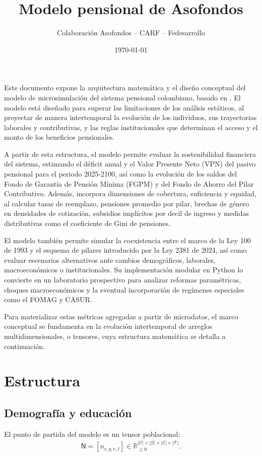 \documentclass[11pt]{article}
\title{\Large\textbf{Modelo pensional de Asofondos} \\[0.2cm]}
\author{\normalsize Colaboración Asofondos -- CARF -- Fedesarrollo}
\date{\normalsize \today}
\begin{document}
\maketitle

Este documento expone la arquitectura matemática y el diseño conceptual del modelo de microsimulación del sistema pensional colombiano, basado en \citet{becerra2025simulation}. El modelo está diseñado para superar las limitaciones de los análisis estáticos, al proyectar de manera intertemporal la evolución de los individuos, sus trayectorias laborales y contributivas, y las reglas institucionales que determinan el acceso y el monto de los beneficios pensionales.

A partir de esta estructura, el modelo permite evaluar la sostenibilidad financiera del sistema, estimando el déficit anual y el Valor Presente Neto (VPN) del pasivo pensional para el periodo 2025-2100, así como la evolución de los saldos del Fondo de Garantía de Pensión Mínima (FGPM) y del Fondo de Ahorro del Pilar Contributivo. Además, incorpora dimensiones de cobertura, suficiencia y equidad, al calcular tasas de reemplazo, pensiones promedio por pilar, brechas de género en densidades de cotización, subsidios implícitos por decil de ingreso y medidas distributivas como el coeficiente de Gini de pensiones.

El modelo también permite simular la coexistencia entre el marco de la Ley 100 de 1993 y el esquema de pilares introducido por la Ley 2381 de 2024, así como evaluar escenarios alternativos ante cambios demográficos, laborales, macroeconómicos o institucionales. Su implementación modular en Python lo convierte en un laboratorio prospectivo para analizar reformas paramétricas, choques macroeconómicos y la eventual incorporación de regímenes especiales como el FOMAG y CASUR.

Para materializar estas métricas agregadas a partir de microdatos, el marco conceptual se fundamenta en la evolución intertemporal de arreglos multidimensionales, o tensores, cuya estructura matemática se detalla a continuación.

\section{Estructura}

\subsection{Demografía y educación}
El punto de partida del modelo es un tensor poblacional:
\begin{align*}
\mathsf{N}
=
[n_{c,g,e,t}]
\in
\mathbb{R}_{\geq 0}^{|\mathcal{C}| \times |\mathcal{G}| \times |\mathcal{E}| \times |\mathcal{T}|}.
\end{align*}
\end{document}
